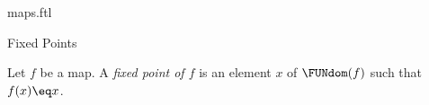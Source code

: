 \documentclass{naproche-library}
\begin{document}
\begin{smodule}[title=Maps]{maps.ftl}
\begin{sfragment}{Fixed Points}
  \begin{definition}[forthel,id=FOUNDATIONS_06_2177076576649216]
    Let $f$ be a map.
    A \emph{fixed point of $f$} is an element $x$ of $\FUNdom(f)$ such that $f(x) \eq x$.
  \end{definition}
\end{sfragment}
\end{smodule}
\end{document}
